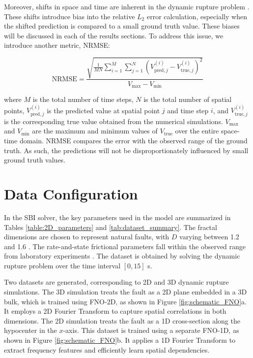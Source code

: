 \documentclass[draft]{agujournal2019}
\begin{document}
Moreover, shifts in space and time are inherent in the dynamic rupture problem \cite{barall2015metrics}. These shifts introduce bias into the relative \(L_2\) error calculation, especially when the shifted prediction is compared to a small ground truth value. These biases will be discussed in each of the results sections. To address this issue, we introduce another metric, NRMSE:

\begin{equation}
\label{eqn:NRMSE}
\text{NRMSE} = \frac{\sqrt{\frac{1}{M N} \sum_{i=1}^{M} \sum_{j=1}^{N} \left( V_{\text{pred}, j}^{(i)} - V_{\text{true}, j}^{(i)} \right)^2 }}{V_{\max} - V_{\min}}
\end{equation}

where \(M\) is the total number of time steps, \(N\) is the total number of spatial points, \(V_{\text{pred}, j}^{(i)}\) is the predicted value at spatial point \(j\) and time step \(i\), and \(V_{\text{true}, j}^{(i)}\) is the corresponding true value obtained from the numerical simulations. \(V_{\max}\) and \(V_{\min}\) are the maximum and minimum values of \(V_{\text{true}}\) over the entire space-time domain. NRMSE compares the error with the observed range of the ground truth. As such, the predictions will not be disproportionately influenced by small ground truth values.

\section{Data Configuration}
\label{sec:data}

 In the SBI solver, the key parameters used in the model are summarized in Tables \ref{table:2D_parameters} and \ref{tab:dataset_summary}. The fractal dimensions are chosen to represent natural faults, with \( D \) varying between 1.2 and 1.6 \cite{renard2017scaling}. The rate-and-state frictional parameters fall within the observed range from laboratory experiments \cite{ikari2011relation, barbot2022rate}. The dataset is obtained by solving the dynamic rupture problem over the time interval \( [0,15] \) s. 

Two datasets are generated, corresponding to 2D and 3D dynamic rupture simulations. The 3D simulation treats the fault as a 2D plane embedded in a 3D bulk, which is trained using FNO-2D, as shown in Figure \ref{fig:schematic_FNO}a. It employs a 2D Fourier Transform to capture spatial correlations in both dimensions. The 2D simulation treats the fault as a 1D cross-section along the hypocenter in the \( x \)-axis. This dataset is trained using a separate FNO-1D, as shown in Figure \ref{fig:schematic_FNO}b. It applies a 1D Fourier Transform to extract frequency features and efficiently learn spatial dependencies. 
\end{document}
